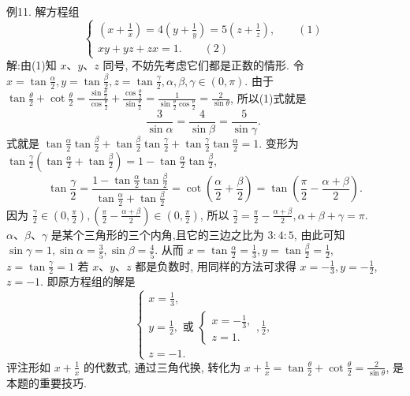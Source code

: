 例11. 解方程组
$$
\left\{\begin{array}{l}
\left(x+\frac{1}{x}\right)=4\left(y+\frac{1}{y}\right)=5\left(z+\frac{1}{z}\right),  \quad\quad(1)\\
x y+y z+z x=1 . \quad\quad(2)
\end{array}\right.
$$
解:由(1)知 $x 、 y 、 z$ 同号, 不妨先考虑它们都是正数的情形.
令 $x=\tan \frac{\alpha}{2}, y=\tan \frac{\beta}{2}, z=\tan \frac{\gamma}{2}, \alpha, \beta, \gamma \in(0, \pi)$.
由于 $\tan \frac{\theta}{2}+\cot \frac{\theta}{2}=\frac{\sin \frac{\theta}{2}}{\cos \frac{\theta}{2}}+\frac{\cos \frac{\theta}{2}}{\sin \frac{\theta}{2}}=\frac{1}{\sin \frac{\theta}{2} \cos \frac{\theta}{2}}=\frac{2}{\sin \theta}$,
所以(1)式就是
$$
\frac{3}{\sin \alpha}=\frac{4}{\sin \beta}=\frac{5}{\sin \gamma} \text {. }
$$
式就是 $\tan \frac{\alpha}{2} \tan \frac{\beta}{2}+\tan \frac{\beta}{2} \tan \frac{\gamma}{2}+\tan \frac{\gamma}{2} \tan \frac{\alpha}{2}=1$.
变形为 $\tan \frac{\gamma}{2}\left(\tan \frac{\alpha}{2}+\tan \frac{\beta}{2}\right)=1-\tan \frac{\alpha}{2} \tan \frac{\beta}{2}$,
$$
\tan \frac{\gamma}{2}=\frac{1-\tan \frac{\alpha}{2} \tan \frac{\beta}{2}}{\tan \frac{\alpha}{2}+\tan \frac{\beta}{2}}=\cot \left(\frac{\alpha}{2}+\frac{\beta}{2}\right)=\tan \left(\frac{\pi}{2}-\frac{\alpha+\beta}{2}\right) .
$$
因为 $\frac{\gamma}{2} \in\left(0, \frac{\pi}{2}\right),\left(\frac{\pi}{2}-\frac{\alpha+\beta}{2}\right) \in\left(0, \frac{\pi}{2}\right)$, 所以 $\frac{\gamma}{2}=\frac{\pi}{2}-\frac{\alpha+\beta}{2}, \alpha+ \beta+\gamma=\pi$.
$\alpha 、 \beta 、 \gamma$ 是某个三角形的三个内角,且它的三边之比为 $3: 4: 5$, 由此可知 $\sin \gamma=1, \sin \alpha=\frac{3}{5}, \sin \beta=\frac{4}{5}$. 从而 $x=\tan \frac{\alpha}{2}=\frac{1}{3}, y=\tan \frac{\beta}{2}=\frac{1}{2}$, $z=\tan \frac{\gamma}{2}=1$
若 $x 、 y 、 z$ 都是负数时, 用同样的方法可求得 $x=-\frac{1}{3}, y=-\frac{1}{2}$, $z=-1$.
即原方程组的解是
$$
\left\{\begin{array}{l}
x=\frac{1}{3}, \\
y=\frac{1}{2}, \text { 或 }\left\{\begin{array}{l}
x=-\frac{1}{3}, \\
z=1 .
\end{array}, \frac{1}{2},\right. \\
z=-1 .
\end{array}\right.
$$
评注形如 $x+\frac{1}{x}$ 的代数式, 通过三角代换, 转化为 $x+\frac{1}{x}=\tan \frac{\theta}{2}+ \cot \frac{\theta}{2}=\frac{2}{\sin \theta}$, 是本题的重要技巧.



